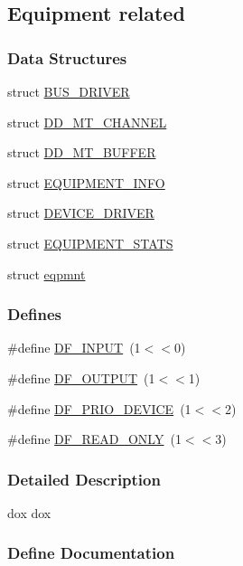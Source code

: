 \subsection{Equipment related}
\label{group__mequipment}
\subsubsection*{Data Structures}
\begin{DoxyCompactItemize}
\item 
struct \hyperlink{structBUS__DRIVER}{BUS\_\-DRIVER}
\item 
struct \hyperlink{structDD__MT__CHANNEL}{DD\_\-MT\_\-CHANNEL}
\item 
struct \hyperlink{structDD__MT__BUFFER}{DD\_\-MT\_\-BUFFER}
\item 
struct \hyperlink{structEQUIPMENT__INFO}{EQUIPMENT\_\-INFO}
\item 
struct \hyperlink{structDEVICE__DRIVER}{DEVICE\_\-DRIVER}
\item 
struct \hyperlink{structEQUIPMENT__STATS}{EQUIPMENT\_\-STATS}
\item 
struct \hyperlink{structeqpmnt}{eqpmnt}
\end{DoxyCompactItemize}
\subsubsection*{Defines}
\begin{DoxyCompactItemize}
\item 
\#define \hyperlink{group__mequipment_gace7257be62c3d56a883e4ad1dff6fdda}{DF\_\-INPUT}~(1$<$$<$0)
\item 
\#define \hyperlink{group__mequipment_ga9a302762256e89a266256dcadd31b90b}{DF\_\-OUTPUT}~(1$<$$<$1)
\item 
\#define \hyperlink{group__mequipment_ga14cf699d29a6edd2088b83e17cda6744}{DF\_\-PRIO\_\-DEVICE}~(1$<$$<$2)
\item 
\#define \hyperlink{group__mequipment_ga4dc67d22ff12f3b0e6daff496f870a7f}{DF\_\-READ\_\-ONLY}~(1$<$$<$3)
\end{DoxyCompactItemize}


\subsubsection{Detailed Description}
dox dox 

\subsubsection{Define Documentation}

